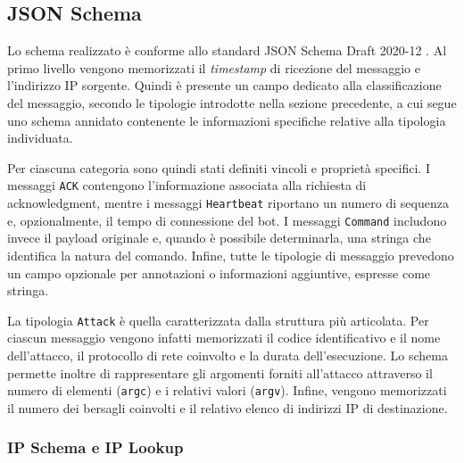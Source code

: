 \subsection{JSON Schema} %


Lo schema realizzato è conforme allo standard JSON Schema Draft 2020-12 \cite{jsonschema2020json}. Al primo livello vengono memorizzati il \emph{timestamp} di ricezione del messaggio e l'indirizzo IP sorgente. Quindi è presente un campo dedicato alla classificazione del messaggio, secondo le tipologie introdotte nella sezione precedente, a cui segue uno schema annidato contenente le informazioni specifiche relative alla tipologia individuata.


Per ciascuna categoria sono quindi stati definiti vincoli e proprietà specifici. I messaggi \texttt{ACK} contengono l'informazione associata alla richiesta di acknowledgment, mentre i messaggi \texttt{Heartbeat} riportano un numero di sequenza e, opzionalmente, il tempo di connessione del bot. I messaggi \texttt{Command} includono invece il payload originale e, quando è possibile determinarla, una stringa che identifica la natura del comando. Infine, tutte le tipologie di messaggio prevedono un campo opzionale per annotazioni o informazioni aggiuntive, espresse come stringa.


La tipologia \texttt{Attack} è quella caratterizzata dalla struttura più articolata. Per ciascun messaggio vengono infatti memorizzati il codice identificativo e il nome dell'attacco, il protocollo di rete coinvolto e la durata dell'esecuzione. Lo schema permette inoltre di rappresentare gli argomenti forniti all'attacco attraverso il numero di elementi (\texttt{argc}) e i relativi valori (\texttt{argv}). Infine, vengono memorizzati il numero dei bersagli coinvolti e il relativo elenco di indirizzi IP di destinazione.

\subsubsection{IP Schema e IP Lookup}

